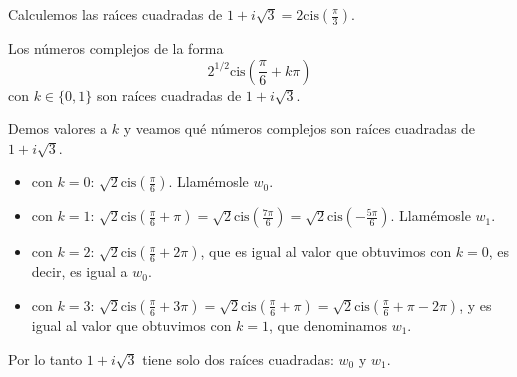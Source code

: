 \begin{ejemplo}{}{}
    Calculemos las ra\'{\i}ces cuadradas de $1+i\sqrt{3} =  2 \mbox{cis}\left(\frac \pi 3\right)$.
        
    Los n\'umeros complejos de la forma
    \[
        2^{1/2} \mbox{cis}\left(\frac \pi 6 + k \pi\right)
    \]
    con $k \in \{0,1\}$ son ra\'ices cuadradas de $1+i\sqrt{3}$. 
     
    Demos valores a $k$ y veamos qu\'e n\'umeros complejos   son ra\'ices cuadradas de $1 +i \sqrt{3}$.    
    \begin{itemize}
        \item con $k = 0$: $\sqrt{2} \mbox{cis}\left(\frac \pi 6\right)$. 
            Llam\'emosle $w_0$.
            
        \item con $k = 1$: 
            $\sqrt{2} \mbox{cis}\left(\frac \pi 6 + \pi\right) =
            \sqrt{2} \mbox{cis}\left(\frac{7 \pi}{6}\right) = 
            \sqrt{2} \mbox{cis}\left(-\frac{5 \pi}{6}\right)$.
            Llam\'emosle $w_1$.
       \item con $k=2$: $\sqrt{2} \mbox{cis}\left(\frac \pi 6 + 2 \pi\right)$,
            que es igual al valor que obtuvimos con $k=0$,
            es decir, es igual a $w_0$.
       \item con $k = 3$:  $\sqrt{2} \mbox{cis}\left(\frac \pi 6 + 3 \pi\right)
            = \sqrt{2} \mbox{cis}\left(\frac \pi 6 + \pi\right) 
            = \sqrt{2} \mbox{cis}\left(\frac \pi 6 + \pi - 2 \pi\right)$,
            y es igual al valor que obtuvimos con $k=1$, que denominamos
            $w_1$.
    \end{itemize}
    Por lo tanto $1+i\sqrt{3}$ tiene solo dos raíces cuadradas: $w_0$ y $w_1$.
    
    
\begin{center}
\end{center}
\end{ejemplo}     
               
